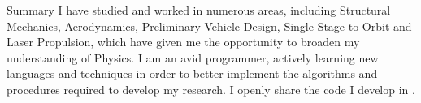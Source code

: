 \begin{cvtext}{Summary}
I have studied and worked in numerous areas, including Structural Mechanics, Aerodynamics, Preliminary Vehicle Design, Single Stage to Orbit and Laser Propulsion, which have given me the opportunity to broaden my understanding of Physics.
I am an avid programmer, actively learning new languages and techniques in order to better implement the algorithms and procedures required to develop my research.
I openly share the code I develop in .

\end{cvtext}